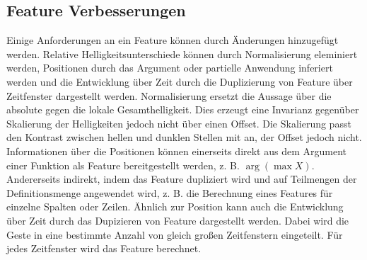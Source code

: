 \subsection{Feature Verbesserungen}
Einige Anforderungen an ein Feature können durch Änderungen hinzugefügt werden. Relative Helligkeitsunterschiede können durch Normalisierung eleminiert werden, Positionen durch das Argument oder partielle Anwendung
inferiert werden und die Entwicklung über Zeit durch die Duplizierung von Feature über Zeitfenster dargestellt werden.
\newline
\newline
Normalisierung ersetzt die Aussage über die absolute gegen die lokale Gesamthelligkeit. Dies erzeugt eine Invarianz gegenüber Skalierung der Helligkeiten jedoch nicht über einen Offset. Die Skalierung passt den
Kontrast zwischen hellen und dunklen Stellen mit an, der Offset jedoch nicht.
\newline
\newline
Informationen über die Positionen können einerseits direkt aus dem Argument einer Funktion als Feature bereitgestellt werden, z. B. $\arg(\max X)$. Andererseits indirekt, indem das Feature dupliziert wird
und auf Teilmengen der Definitionsmenge angewendet wird, z. B. die Berechnung eines Features für einzelne Spalten oder Zeilen.
\newline
\newline
Ähnlich zur Position kann auch die Entwicklung über Zeit durch das Dupizieren von Feature dargestellt werden. Dabei wird die Geste in eine bestimmte Anzahl von gleich großen Zeitfenstern eingeteilt. Für jedes
Zeitfenster wird das Feature berechnet.
